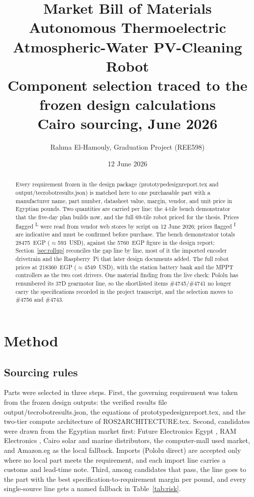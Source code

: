 \documentclass[11pt,a4paper]{article}
\title{\textbf{Market Bill of Materials}\\[0.4em]
\large Autonomous Thermoelectric Atmospheric-Water PV-Cleaning Robot\\[0.2em]
\normalsize Component selection traced to the frozen design calculations\\
Cairo sourcing, June 2026}
\author{Rahma El-Hamouly, Graduation Project (REE598)}
\date{12 June 2026}
\newcommand{\liveflag}{\textsuperscript{L}}
\newcommand{\indflag}{\textsuperscript{I}}
\newcommand{\fname}[1]{{\ttfamily\def\_{\textunderscore\allowbreak}#1}}
\begin{document}
\maketitle

\begin{abstract}
\noindent
Every requirement frozen in the design package
(\fname{prototype\_design\_report.tex} and
\fname{output/tec\_robot\_results.json}) is matched here to one purchasable
part with a manufacturer name, part number, datasheet value, margin, vendor,
and unit price in Egyptian pounds. Two quantities are carried per line: the
4-tile bench demonstrator that the five-day plan builds now, and the full
69-tile robot priced for the thesis. Prices flagged \liveflag{} were read from
vendor web stores by script on 12 June 2026; prices flagged \indflag{} are
indicative and must be confirmed before purchase. The bench demonstrator
totals \num{28475}~EGP ($\approx$\num{593}~USD), against the
\num{5760}~EGP figure in the design report; Section~\ref{sec:rollup}
reconciles the gap line by line, most of it the imported encoder drivetrain
and the Raspberry~Pi that later design documents added. The full robot prices
at \num{218360}~EGP ($\approx$\num{4549}~USD), with the station battery bank
and the MPPT controllers as the two cost drivers. One material finding from
the live check: Pololu has renumbered its 37D gearmotor line, so the
shortlisted items \#4745/\#4741 no longer carry the specifications recorded in
the project transcript, and the selection moves to \#4756 and \#4743.
\end{abstract}

\section{Method}
\label{sec:method}

\subsection{Sourcing rules}
Parts were selected in three steps. First, the governing requirement was taken
from the frozen design outputs: the verified results file
\fname{output/tec\_robot\_results.json}, the equations of
\fname{prototype\_design\_report.tex}, and the two-tier compute architecture
of \fname{ROS2\_ARCHITECTURE.tex}. Second, candidates were drawn from the
Egyptian market first: Future Electronics Egypt \cite{futelec2026store}, RAM
Electronics \cite{ramshop2026}, Cairo solar and marine distributors, the
computer-mall used market, and Amazon.eg as the local fallback. Imports
(Pololu direct) are accepted only where no local part meets the requirement,
and each import line carries a customs and lead-time note. Third, among
candidates that pass, the line goes to the part with the best
specification-to-requirement margin per pound, and every single-source line
gets a named fallback in Table~\ref{tab:risk}.
\end{document}
